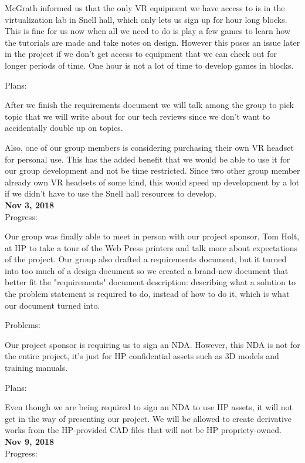 McGrath informed us that the only VR equipment we have access to is in the virtualization lab in Snell hall, which only lets us sign up for hour long blocks. This is fine for us now when all we need to do is play a few games to learn how the tutorials are made and take notes on design. However this poses an issue later in the project if we don't get access to equipment that we can check out for longer periods of time. One hour is not a lot of time to develop games in blocks.

Plans:

After we finish the requirements document we will talk among the group to pick topic that we will write about for our tech reviews since we don't want to accidentally double up on topics.

Also, one of our group members is considering purchasing their own VR headset for personal use. This has the added benefit that we would be able to use it for our group development and not be time restricted. Since two other group member already own VR headsets of some kind, this would speed up development by a lot if we didn't have to use the Snell hall resources to develop.\\

\textbf{Nov 3, 2018}\\
Progress:

Our group was finally able to meet in person with our project sponsor, Tom Holt, at HP to take a tour of the Web Press printers and talk more about expectations of the project. Our group also drafted a requirements document, but it turned into too much of a design document so we created a brand-new document that better fit the "requirements" document description: describing what a solution to the problem statement is required to do, instead of how to do it, which is what our document turned into.

Problems:

Our project sponsor is requiring us to sign an NDA. However, this NDA is not for the entire project, it's just for HP confidential assets such as 3D models and training manuals.

Plans:

Even though we are being required to sign an NDA to use HP assets, it will not get in the way of presenting our project. We will be allowed to create derivative works from the HP-provided CAD files that will not be HP propriety-owned.\\

\textbf{Nov 9, 2018}\\
Progress:

